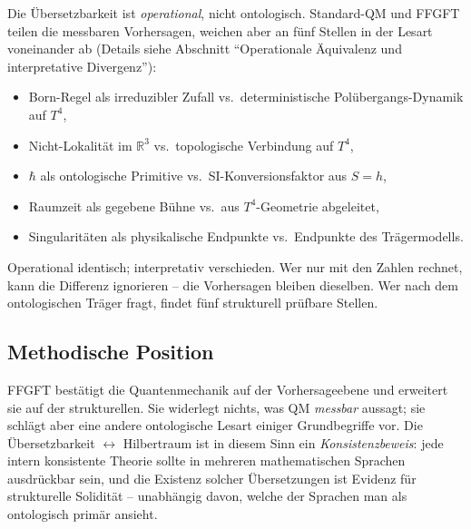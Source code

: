 Die Übersetzbarkeit ist \emph{operational}, nicht ontologisch.
Standard-QM und FFGFT teilen die messbaren Vorhersagen, weichen aber
an fünf Stellen in der Lesart voneinander ab (Details siehe
Abschnitt \enquote{Operationale Äquivalenz und interpretative
Divergenz}):

\begin{itemize}[leftmargin=2em,itemsep=2pt,topsep=2pt]
  \item Born-Regel als irreduzibler Zufall vs.\ deterministische
        Polübergangs-Dynamik auf $T^4$,
  \item Nicht-Lokalität im $\mathbb{R}^3$ vs.\ topologische
        Verbindung auf $T^4$,
  \item $\hbar$ als ontologische Primitive vs.\ SI-Konversionsfaktor
        aus $S=h$,
  \item Raumzeit als gegebene Bühne vs.\ aus $T^4$-Geometrie
        abgeleitet,
  \item Singularitäten als physikalische Endpunkte vs.\ Endpunkte
        des Trägermodells.
\end{itemize}

Operational identisch; interpretativ verschieden. Wer nur mit den
Zahlen rechnet, kann die Differenz ignorieren -- die Vorhersagen
bleiben dieselben. Wer nach dem ontologischen Träger fragt, findet
fünf strukturell prüfbare Stellen.

\subsection*{Methodische Position}

FFGFT bestätigt die Quantenmechanik auf der Vorhersageebene und
erweitert sie auf der strukturellen. Sie widerlegt nichts, was QM
\emph{messbar} aussagt; sie schlägt aber eine andere ontologische
Lesart einiger Grundbegriffe vor. Die Übersetzbarkeit
$\leftrightarrow$ Hilbertraum ist in diesem Sinn ein
\emph{Konsistenzbeweis}: jede intern konsistente Theorie sollte in
mehreren mathematischen Sprachen ausdrückbar sein, und die Existenz
solcher Übersetzungen ist Evidenz für strukturelle Solidität --
unabhängig davon, welche der Sprachen man als ontologisch primär
ansieht.
